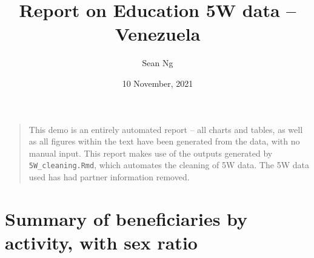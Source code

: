\documentclass[
]{article}
\title{Report on Education 5W data -- Venezuela}
\author{Sean Ng}
\date{10 November, 2021}
\begin{document}
\maketitle

\begin{quote}
This demo is an entirely automated report -- all charts and tables, as
well as all figures within the text have been generated from the data,
with no manual input. This report makes use of the outputs generated by
\texttt{5W\_cleaning.Rmd}, which automates the cleaning of 5W data. The
5W data used has had partner information removed.
\end{quote}

\hypertarget{summary-of-beneficiaries-by-activity-with-sex-ratio}{%
\section{Summary of beneficiaries by activity, with sex
ratio}\label{summary-of-beneficiaries-by-activity-with-sex-ratio}}
\end{document}
